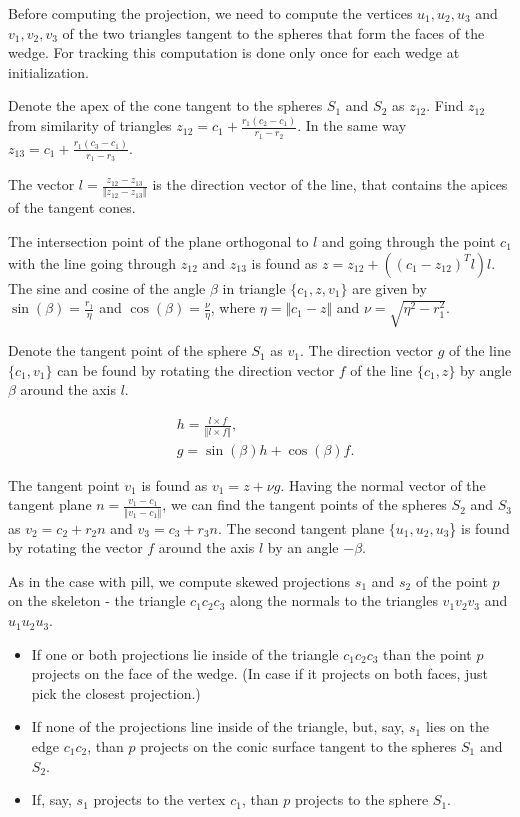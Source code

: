 \begin{DRAFT}
Before computing the projection, we need to compute the vertices $u_1, u_2, u_3$ and $v_1, v_2, v_3$ of the two triangles tangent to the spheres that form the faces of the wedge. For tracking this computation is done only once for each wedge at initialization.

Denote the apex of the cone tangent to the spheres $S_1$ and $S_2$ as $z_{12}$. Find $z_{12}$ from similarity of triangles $z_{12} = c_1 +\frac{r_1 (c_2 - c_1)}{r_1 - r_2}$. In the same way $z_{13} = c_1 +\frac{r_1 (c_3 - c_1)}{r_1 - r_3}$.

The vector $l = \frac{z_{12} - z_{13}} {\Vert z_{12} - z_{13} \Vert}$ is the direction vector of the line, that contains the apices of the tangent cones.

The intersection point of the plane orthogonal to $l$ and going through the point $c_1$ with the line going through $z_{12}$ and $z_{13}$ is found as
$z = z_{12} + ((c_1 - z_{12})^T l )l$.
The sine and cosine of the angle $\beta$ in triangle $\{c_1, z, v_1\}$ are given by 
$\sin(\beta) = \frac{r_1}{\eta}$ 
and 
$\cos(\beta) = \frac{\nu}{\eta}$,
where $\eta = \Vert c_1 - z \Vert $ and $\nu = \sqrt{\eta^2 -  r_1^2}$. 

Denote the tangent point of the sphere $S_1$ as $v_1$. The direction vector $g$ of the line $\{c_1, v_1\}$ can be found by rotating the direction vector $f$ of the line 
$\{c_1, z\}$ by angle $\beta$ around the axis $l$.

\begin{align*}
	& h = \frac{l \times f}{\Vert l \times f \Vert}, \\
	& g = \sin(\beta) h + \cos(\beta) f.	
\end{align*}

The tangent point $v_1$ is found as $v_1 = z + \nu  g$. Having the normal vector of the tangent plane $n = \frac{v_1 - c_1}{\Vert v_1 - c_1 \Vert}$, we can find the tangent points of the spheres $S_2$ and $S_3$ as $v_2 = c_2  + r_2 n$ and $v_3 = c_3 + r_3 n$.
The second tangent plane $\{u_1, u_2, u_3$\} is found by rotating the vector $f$ around the axis $l$ by an angle $-\beta$.

As in the case with pill, we compute skewed projections $s_1$ and $s_2$ of the point $p$ on the skeleton  - the triangle $c_1 c_2 c_3$ along the normals to the triangles $v_1 v_2 v_3$ and $u_1 u_2 u_3$.

\begin{itemize}
\item If one or both projections lie inside of the triangle $c_1 c_2 c_3$ than the point $p$ projects on the face of the wedge. (In case if it projects on both faces, just pick the closest projection.) 
\item If none of the projections line inside of the triangle, but, say, $s_1$ lies on the edge $c_1 c_2$, than $p$ projects on the conic surface tangent to the spheres $S_1$ and $S_2$. 
\item If, say, $s_1$ projects to the vertex $c_1$, than $p$ projects to the sphere $S_1$.
\end{itemize}


\end{DRAFT}
